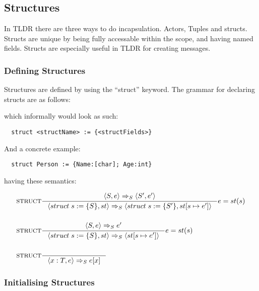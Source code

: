 \subsection{Structures}
\label{subsec:structs}

In TLDR there are three ways to do incapsulation. Actors, Tuples and structs. Structs are unique by being fully accessable within the scope, and having named fields. Structs are especially useful in TLDR for creating messages.

\subsubsection{Defining Structures}
\label{sec:defStructures}

Structures are defined by using the \enquote{struct} keyword. The grammar for declaring structs are as follows:


which informally would look as such:

\begin{verbatim}
  struct <structName> := {<structFields>}
\end{verbatim}

And a concrete example:

\begin{verbatim}
  struct Person := {Name:[char]; Age:int}
\end{verbatim}

having these semantics:

\begin{align*}
&\inference[$\text{STRUCT}$]{\Braket{S, e} \Rightarrow_S \Braket{S', e'}}
                            {\Braket{struct\;s := \{S\}, st} \Rightarrow_S \Braket{struct\;s := \{S'\}, st[s \mapsto e']}}
                            {e=st(s)}
\\\\
&\inference[$\text{STRUCT}$]{\Braket{S, e} \Rightarrow_S e'}
                            {\Braket{struct\;s := \{S\}, st} \Rightarrow_S \Braket{st[s \mapsto e']}}
                            {e=st(s)}
\\\\
&\inference[$\text{STRUCT}$]{}
                            {\Braket{x:T, e} \Rightarrow_S e[x]}
\end{align*}

\subsubsection{Initialising Structures}
\label{sec:initStructures}

